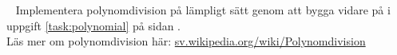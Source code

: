 


\SOLUTION


\TaskSolved \what \TODO



\QUESTEND





\QUESTBEGIN

\Task  \what~ Implementera polynomdivision på lämpligt sätt genom att bygga vidare på   i  uppgift \ref{task:polynomial} på sidan \pageref{task:polynomial}.  \\ Läs mer om polynomdivision här: \href{https://sv.wikipedia.org/wiki/Polynomdivision}{sv.wikipedia.org/wiki/Polynomdivision}

\SOLUTION


\TaskSolved \what \TODO

\QUESTEND
